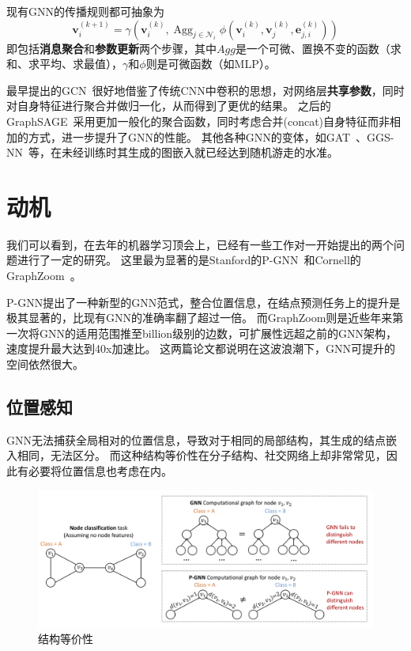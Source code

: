 \documentclass[reportComp]{thesis}
\begin{document}
现有GNN的传播规则都可抽象为\cite{fey:pytorch_geo_2019}
\[\mathbf{v}_i^{(k+1)}=\gamma\left(\mathbf{v}_i^{(k)},\mathop{Agg}_{j\in\mathcal{N}_i}\phi(\mathbf{v}_i^{(k)},\mathbf{v}_j^{(k)},\mathbf{e}_{j,i}^{(k)})\right)\]
即包括\textbf{消息聚合}和\textbf{参数更新}两个步骤，其中$Agg$是一个可微、置换不变的函数（求和、求平均、求最值），$\gamma$和$\phi$则是可微函数（如MLP）。

最早提出的GCN~\cite{kipf:gcn_iclr_2017}很好地借鉴了传统CNN中卷积的思想，对网络层\textbf{共享参数}，同时对自身特征进行聚合并做归一化，从而得到了更优的结果。
之后的GraphSAGE~\cite{hamilton:graphsage_neurips_2017}采用更加一般化的聚合函数，同时考虑合并(concat)自身特征而非相加的方式，进一步提升了GNN的性能。
其他各种GNN的变体，如GAT~\cite{velickovic:gat_iclr_2018}、GGS-NN~\cite{li:ggsnn_iclr_2016}等，在未经训练时其生成的图嵌入就已经达到随机游走的水准。

\section{动机}
我们可以看到，在去年的机器学习顶会上，已经有一些工作对一开始提出的两个问题进行了一定的研究。
这里最为显著的是Stanford的P-GNN~\cite{you:pgnn_icml_2019}和Cornell的GraphZoom~\cite{deng:graphzoom_iclr_2019}。

P-GNN提出了一种新型的GNN范式，整合位置信息，在结点预测任务上的提升是极其显著的，比现有GNN的准确率翻了超过一倍。
而GraphZoom则是近些年来第一次将GNN的适用范围推至billion级别的边数，可扩展性远超之前的GNN架构，速度提升最大达到40x加速比。
这两篇论文都说明在这波浪潮下，GNN可提升的空间依然很大。

\subsection{位置感知}
GNN无法捕获全局相对的位置信息，导致对于相同的局部结构，其生成的结点嵌入相同，无法区分。
而这种结构等价性在分子结构、社交网络上却非常常见，因此有必要将位置信息也考虑在内。
\begin{figure}[H]
\centering
\includegraphics[width=0.8\linewidth]{fig/pgnn-example.png}
\caption{结构等价性}
\end{figure}
\end{document}
